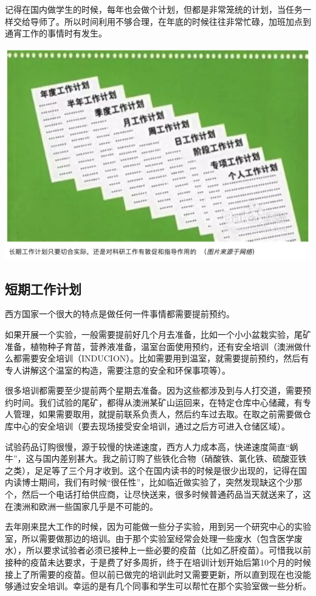 \documentclass[]{book}
\begin{document}
记得在国内做学生的时候，每年也会做个计划，但都是非常笼统的计划，当任务一样交给导师了。所以时间利用不够合理，在年底的时候往往非常忙碌，加班加点到通宵工作的事情时有发生。

\includegraphics[width=8.33in]{images/osre2}

\subsection{短期工作计划}

西方国家一个很大的特点是做任何一件事情都需要提前预约。

如果开展一个实验，一般需要提前好几个月去准备，比如一个小小盆栽实验，尾矿准备，植物种子育苗，营养液准备，温室台面使用预约，还有安全培训（澳洲做什么都需要安全培训（INDUCION）。比如需要用到温室，就需要提前预约，然后有专人讲解这个温室的构造，需要注意的安全和环保事项等）。

很多培训都需要至少提前两个星期去准备。因为这些都涉及到与人打交道，需要预约时间。我们试验的尾矿，都得从澳洲某矿山运回来，在特定仓库中心储藏，有专人管理，如果需要取用，就提前联系负责人，然后约车过去取。在取之前需要做仓库中心的安全培训（要去现场接受安全培训，通过之后方可进入仓储区域）。

试验药品订购很慢，源于较慢的快递速度，西方人力成本高，快递速度简直``蜗牛''，这与国内差别甚大。我之前订购了些铁化合物（硝酸铁、氯化铁、硫酸亚铁之类），足足等了三个月才收到。这个在国内读书的时候是很少出现的，记得在国内读博士期间，我们有时候``很任性''，比如临近做实验了，突然发现缺这个少那个，然后一个电话打给供应商，让尽快送来，很多时候普通药品当天就送来了，这在澳洲和欧洲一些国家几乎是不可能的。

去年刚来昆大工作的时候，因为可能做一些分子实验，用到另一个研究中心的实验室，所以需要做那边的培训。由于那个实验室经常会处理一些废水（包含医学废水），所以要求试验者必须已接种上一些必要的疫苗（比如乙肝疫苗）。可惜我以前接种的疫苗未达要求，于是费了好多周折，终于在培训计划开始后第10个月的时候接上了所需要的疫苗。但以前已做完的培训此时又需要更新，所以直到现在也没能够通过安全培训。幸运的是有几个同事和学生可以帮忙在那个实验室做一些分析。
\end{document}
